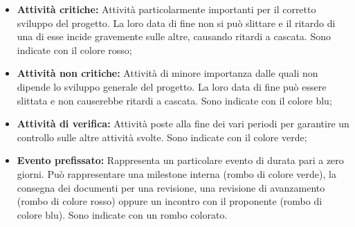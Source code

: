 \begin{itemize}
    \item \textbf{Attività critiche:} Attività particolarmente importanti per il corretto sviluppo del progetto. La loro data di fine non si può slittare e il ritardo di una di esse
    incide gravemente sulle altre, causando ritardi a cascata. Sono indicate con il colore rosso;
    \item \textbf{Attività non critiche:} Attività di minore importanza dalle quali non dipende lo sviluppo generale del progetto. La loro data di fine può essere slittata e non causerebbe ritardi a cascata.
    Sono indicate con il colore blu;
    \item \textbf{Attività di verifica:} Attività poste alla fine dei vari periodi per garantire un controllo sulle altre attività svolte.
    Sono indicate con il colore verde;
    \item \textbf{Evento prefissato:} Rappresenta un particolare evento di durata pari a zero giorni. Può rappresentare una milestone interna (rombo di colore verde), la consegna dei documenti
    per una revisione, una revisione di avanzamento (rombo di colore rosso) oppure un incontro con il
    proponente (rombo di colore blu). Sono indicate con un rombo colorato.
  \end{itemize}

